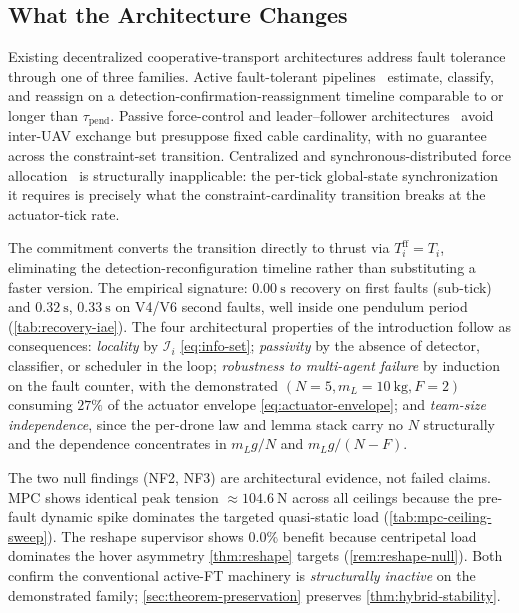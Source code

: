 \subsection{What the Architecture Changes}
\label{sec:discussion-advance}

Existing decentralized cooperative-transport architectures address fault tolerance through one of three families. Active fault-tolerant pipelines~\cite{LiuSuspensionFailure2021} estimate, classify, and reassign on a detection-confirmation-reassignment timeline comparable to or longer than $\tau_{\mathrm{pend}}$. Passive force-control and leader--follower architectures~\cite{GassnerPassiveForce2017,NoCommTransport2021} avoid inter-UAV exchange but presuppose fixed cable cardinality, with no guarantee across the constraint-set transition. Centralized and synchronous-distributed force allocation~\cite{Michael2011,WangOng2017,LiLoianno2023,PallarLi2025,SuBhowmick2023} is structurally inapplicable: the per-tick global-state synchronization it requires is precisely what the constraint-cardinality transition breaks at the actuator-tick rate.

The commitment converts the transition directly to thrust via $T_i^{\mathrm{ff}}=T_i$, eliminating the detection-reconfiguration timeline rather than substituting a faster version. The empirical signature: $\SI{0.00}{\second}$ recovery on first faults (sub-tick) and $\SI{0.32}{\second}$, $\SI{0.33}{\second}$ on V4/V6 second faults, well inside one pendulum period (\cref{tab:recovery-iae}). The four architectural properties of the introduction follow as consequences: \emph{locality} by $\mathcal{I}_i$ \eqref{eq:info-set}; \emph{passivity} by the absence of detector, classifier, or scheduler in the loop; \emph{robustness to multi-agent failure} by induction on the fault counter, with the demonstrated $(N{=}5,m_L{=}\SI{10}{\kilo\gram},F{=}2)$ consuming $27\%$ of the actuator envelope \eqref{eq:actuator-envelope}; and \emph{team-size independence}, since the per-drone law and lemma stack carry no $N$ structurally and the dependence concentrates in $m_Lg/N$ and $m_Lg/(N{-}F)$.

The two null findings (NF2, NF3) are architectural evidence, not failed claims. MPC shows identical peak tension $\approx \SI{104.6}{\newton}$ across all ceilings because the pre-fault dynamic spike dominates the targeted quasi-static load (\cref{tab:mpc-ceiling-sweep}). The reshape supervisor shows $0.0\%$ benefit because centripetal load dominates the hover asymmetry \cref{thm:reshape} targets (\cref{rem:reshape-null}). Both confirm the conventional active-FT machinery is \emph{structurally inactive} on the demonstrated family; \cref{sec:theorem-preservation} preserves \cref{thm:hybrid-stability}.

